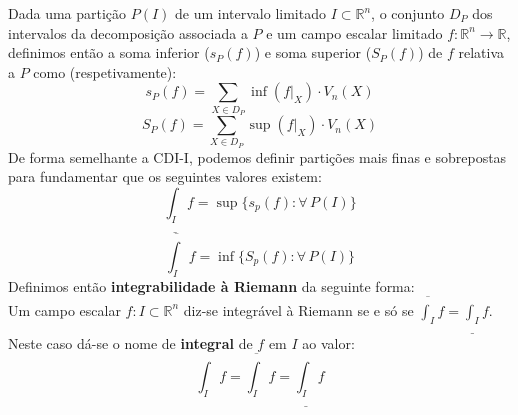 \documentclass{article}
\begin{document}
Dada uma partição $P(I)$ de um intervalo limitado $I \subset \mathbb{R}^n$, o conjunto $D_P$ dos intervalos da decomposição associada a $P$ e um campo escalar limitado $f: \mathbb{R}^n \to \mathbb{R}$, definimos então a soma inferior ($s_P(f)$) e soma superior ($S_P(f)$) de $f$ relativa a $P$ como (respetivamente):
$$
s_P(f) = \sum_{X \in D_P} \inf(f|_X) \cdot V_n(X)
$$
$$
S_P(f) = \sum_{X \in D_P} \sup(f|_X) \cdot V_n(X)
$$
De forma semelhante a CDI-I, podemos definir partições mais finas e sobrepostas para fundamentar que os seguintes valores existem:
$$
\underline{\int_I} f = \sup \{ s_p(f): \forall \, P(I) \}
$$
$$
\overline{\int_I} f = \inf \{ S_p(f): \forall \, P(I) \}
$$
Definimos então \textbf{integrabilidade à Riemann} da seguinte forma:\\
Um campo escalar $f: I \subset \mathbb{R}^n$ diz-se integrável à Riemann se e só se $\overline{\int_I} f = \underline{\int_I} f$. Neste caso dá-se o nome de \textbf{integral} de $f$ em $I$ ao valor:
$$
\int_I f = \overline{\int_I} f = \underline{\int_I} f
$$
\end{document}
